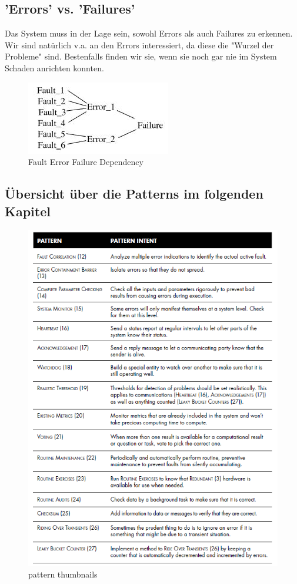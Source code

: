 \subsection{'Errors' vs. 'Failures'}


Das System muss in der Lage sein, sowohl Errors als auch Failures zu erkennen. Wir sind natürlich v.a. an den Errors interessiert, da diese die "Wurzel der Probleme" sind. Bestenfalls finden wir sie, wenn sie noch gar nie im System Schaden anrichten konnten.

\begin{figure}[H]
	\centering
	\includegraphics{content/faulttolerance/images/FaultErrorFailureDependency.JPG}
	\caption{Fault Error Failure Dependency}
\end{figure}


\subsection{Übersicht über die Patterns im folgenden Kapitel}


\begin{figure}
	\centering
	\includegraphics{content/faulttolerance/images/pattern_thumbnails.png}
	\caption{pattern thumbnails}
\end{figure}


